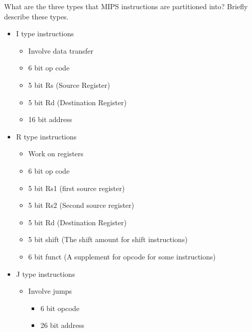 \documentclass{exam}
\begin{document}
\begin{questions}
\newpage
\question[6]What are the three types that MIPS instructions are partitioned into? Briefly describe these types.
\begin{solution}[2in]
	\begin{itemize}
		\item I type instructions
		\begin{itemize}
			\item Involve data transfer
			\item 6 bit op code
			\item 5 bit Rs (Source Register)
			\item 5 bit Rd (Destination Register)
			\item 16 bit address
		\end{itemize}
		\item R type instructions
		\begin{itemize}
			\item Work on registers
			\item 6 bit op code
			\item 5 bit Rs1 (first source register)
			\item 5 bit Rs2 (Second source register)
			\item 5 bit Rd (Destination Register)
			\item 5 bit shift (The shift amount for shift instructions)
			\item 6 bit funct (A supplement for opcode for some instructions)
		\end{itemize}
		\item J type instructions
		\begin{itemize}
			\item Involve jumps
			\begin{itemize}
				\item 6 bit opcode
				\item 26 bit address
			\end{itemize}
		\end{itemize}
	\end{itemize}
\end{solution}


\end{questions}
\end{document}

